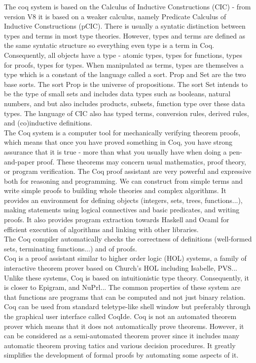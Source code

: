 The coq system is based on the Calculus of Inductive Constructions (CIC) - from version V8 it is based on a weaker calculus, namely Predicate Calculus of Inductive Constructions (pCIC). There is usually a syntatic distinction between types and terms in most type theories. However, types and terms are defined as the same syntatic structure so everything even type is a term in Coq. Consequently, all objects have a type - atomic types, types for functions, types for proofs, types for types. When manipulated as terms, types are themselves a type which is a constant of the language called a sort. Prop and Set are the two base sorts. The sort Prop is the universe of propositions. The sort Set intends to be the type of small sets and includes data types such as booleans, natural numbers, and but also includes products, subsets, function type over these data types. The language of CIC also has typed terms, conversion rules, derived rules, and (co)inductive definitions.\\ 
The Coq system is a computer tool for mechanically verifying theorem proofs, which means that once you have proved something in Coq, you have strong assurance that it is true - more than what you usually have when doing a pen-and-paper proof. These theorems may concern usual mathematics, proof theory, or program verification. The Coq proof assistant are very powerful and expressive both for reasoning and programming. We can construct from simple terms and write simple proofs to building whole theories and complex algorithms. It provides an environment for defining objects (integers, sets, trees, functions...), making statements using logical connectives and basic predicates, and writing proofs. It also provides program extraction towards Haskell and Ocaml for efficient execution of algorithms and linking with other libraries.\\
The Coq compiler automatically checks the correctness of definitions (well-formed
sets, terminating functions...) and of proofs.\\
Coq is a proof assistant similar to higher order logic (HOL) systems, a family of interactive theorem prover based on Church's HOL including Isabelle, PVS... Unlike these systems, Coq is based on intuitionistic type theory. Consequently, it is closer to Epigram, and NuPrl... The common properties of these system are that functions are programs that can be computed and not just binary relation.
Coq can be used from standard teletype-like shell window but preferably through the graphical user interface called CoqIde. Coq is not an automated theorem prover which means that it does not automatically prove theorems. However, it can be considered as a semi-automated theorem prover since it includes many automatic theorem proving tatics and various decision procedures. It greatly simplifies the development of formal proofs by automating some aspects of it. 
